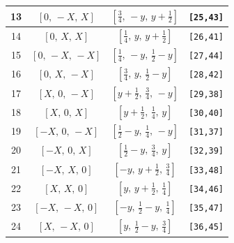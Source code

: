 \documentclass[fleqn,8pt]{jsarticle}
\begin{document}
\begin{longtable}{cccc}
13 & $\left[ 0,\, - X,\, X \right]$ & $\left[ \frac{3}{4},\, - y,\, y + \frac{1}{2} \right]$ & {\tt [25,43]} \\ \hline
14 & $\left[ 0,\, X,\, X \right]$ & $\left[ \frac{1}{4},\, y,\, y + \frac{1}{2} \right]$ & {\tt [26,41]} \\ \hline
15 & $\left[ 0,\, - X,\, - X \right]$ & $\left[ \frac{1}{4},\, - y,\, \frac{1}{2} - y \right]$ & {\tt [27,44]} \\ \hline
16 & $\left[ 0,\, X,\, - X \right]$ & $\left[ \frac{3}{4},\, y,\, \frac{1}{2} - y \right]$ & {\tt [28,42]} \\ \hline
17 & $\left[ X,\, 0,\, - X \right]$ & $\left[ y + \frac{1}{2},\, \frac{3}{4},\, - y \right]$ & {\tt [29,38]} \\ \hline
18 & $\left[ X,\, 0,\, X \right]$ & $\left[ y + \frac{1}{2},\, \frac{1}{4},\, y \right]$ & {\tt [30,40]} \\ \hline
19 & $\left[ - X,\, 0,\, - X \right]$ & $\left[ \frac{1}{2} - y,\, \frac{1}{4},\, - y \right]$ & {\tt [31,37]} \\ \hline
20 & $\left[ - X,\, 0,\, X \right]$ & $\left[ \frac{1}{2} - y,\, \frac{3}{4},\, y \right]$ & {\tt [32,39]} \\ \hline
21 & $\left[ - X,\, X,\, 0 \right]$ & $\left[ - y,\, y + \frac{1}{2},\, \frac{3}{4} \right]$ & {\tt [33,48]} \\ \hline
22 & $\left[ X,\, X,\, 0 \right]$ & $\left[ y,\, y + \frac{1}{2},\, \frac{1}{4} \right]$ & {\tt [34,46]} \\ \hline
23 & $\left[ - X,\, - X,\, 0 \right]$ & $\left[ - y,\, \frac{1}{2} - y,\, \frac{1}{4} \right]$ & {\tt [35,47]} \\ \hline
24 & $\left[ X,\, - X,\, 0 \right]$ & $\left[ y,\, \frac{1}{2} - y,\, \frac{3}{4} \right]$ & {\tt [36,45]} \\
\end{longtable}
\renewcommand{\arraystretch}{1.2}
\end{document}
